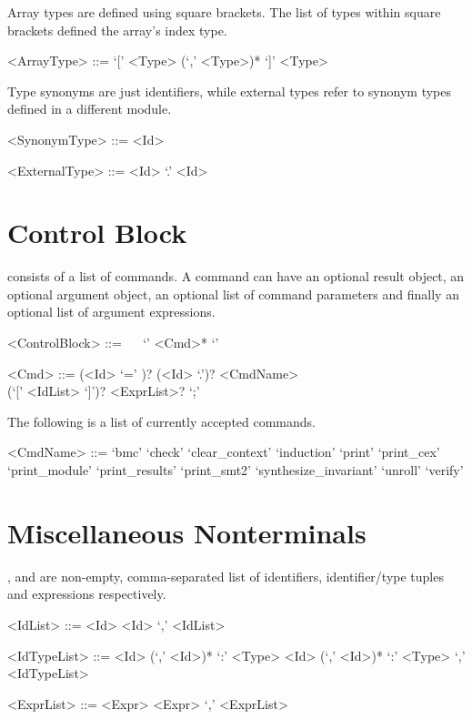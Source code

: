 Array types are defined using square brackets. The list of types within square brackets defined the array's index type.
\begin{grammar}
    <ArrayType> ::= `[' <Type> (`,' <Type>)* `]' <Type>
\end{grammar}

Type synonyms are just identifiers, while external types refer to synonym types defined in a different module.
\begin{grammar}
    <SynonymType> ::= <Id>

    <ExternalType> ::= <Id> `.' <Id>
\end{grammar}

\section{Control Block}
 consists of a list of commands. A command can have an optional result object, an optional argument object, an optional list of command parameters and finally an optional list of argument expressions. 
\begin{grammar}
     <ControlBlock> ::= ~~ `{' <Cmd>* `}'

     <Cmd> ::= (<Id> `=' )? (<Id> `.')? <CmdName> \\
              (`[' <IdList> `]')? <ExprList>? `;'
\end{grammar}


The following is a list of currently accepted commands.

\begin{grammar}
    <CmdName> ::= `bmc' \alt
                  `check' \alt
                  `clear\_context' \alt
                  `induction' \alt
                  `print' \alt
                  `print\_cex' \alt
                  `print\_module' \alt
                  `print\_results' \alt
                  `print\_smt2'
                  `synthesize\_invariant' \alt
                  `unroll' \alt
                  `verify'
\end{grammar}

\section{Miscellaneous Nonterminals} 

,  and  are non-empty, comma-separated list of identifiers, identifier/type tuples and expressions respectively.
\begin{grammar}
     <IdList> ::= <Id> \alt <Id> `,' <IdList>

     <IdTypeList> ::=  <Id> (`,' <Id>)* `:' <Type> 
                  \alt <Id> (`,' <Id>)* `:' <Type> `,' <IdTypeList>

     <ExprList> ::=  <Expr>
                \alt <Expr> `,' <ExprList>
\end{grammar}

